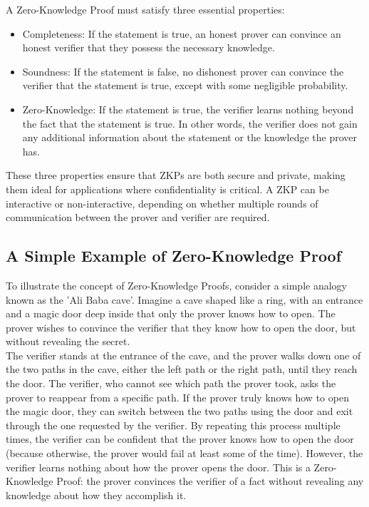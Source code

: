 A Zero-Knowledge Proof must satisfy three essential properties:
\begin{itemize}
    \item Completeness: If the statement is true, an honest prover can convince an honest verifier that they possess the necessary knowledge.
    \item Soundness: If the statement is false, no dishonest prover can convince the verifier that the statement is true, except with some negligible probability.
    \item Zero-Knowledge: If the statement is true, the verifier learns nothing beyond the fact that the statement is true. In other words, the verifier does not gain any additional information about the statement or the knowledge the prover has.
\end{itemize}

These three properties ensure that ZKPs are both secure and private, making them ideal for applications where confidentiality is critical. A ZKP can be interactive or non-interactive, depending on whether multiple rounds of communication between the prover and verifier are required.

\subsection{A Simple Example of Zero-Knowledge Proof}

To illustrate the concept of Zero-Knowledge Proofs, consider a simple analogy known as the 'Ali Baba cave'. Imagine a cave shaped like a ring, with an entrance and a magic door deep inside that only the prover knows how to open. The prover wishes to convince the verifier that they know how to open the door, but without revealing the secret.
\\
The verifier stands at the entrance of the cave, and the prover walks down one of the two paths in the cave, either the left path or the right path, until they reach the door. The verifier, who cannot see which path the prover took, asks the prover to reappear from a specific path. If the prover truly knows how to open the magic door, they can switch between the two paths using the door and exit through the one requested by the verifier.
By repeating this process multiple times, the verifier can be confident that the prover knows how to open the door (because otherwise, the prover would fail at least some of the time). However, the verifier learns nothing about how the prover opens the door. This is a Zero-Knowledge Proof: the prover convinces the verifier of a fact without revealing any knowledge about how they accomplish it.

